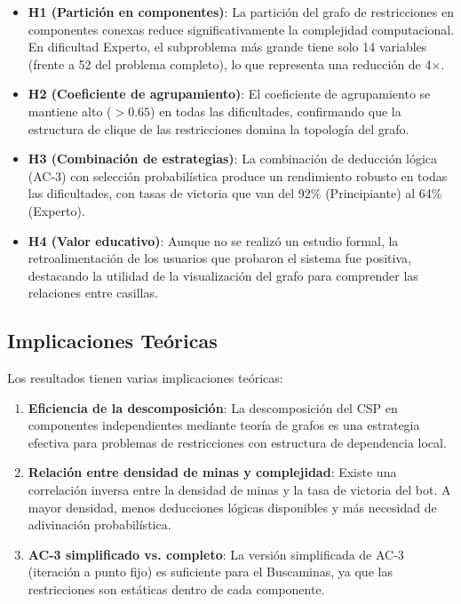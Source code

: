 \documentclass[12pt,a4paper]{article}
\begin{document}
\begin{itemize}[itemsep=2pt]
    \item \textbf{H1 (Partición en componentes)}: La partición del grafo de restricciones en componentes conexas reduce significativamente la complejidad computacional. En dificultad Experto, el subproblema más grande tiene solo 14 variables (frente a 52 del problema completo), lo que representa una reducción de 4$\times$.

    \item \textbf{H2 (Coeficiente de agrupamiento)}: El coeficiente de agrupamiento se mantiene alto ($>0.65$) en todas las dificultades, confirmando que la estructura de clique de las restricciones domina la topología del grafo.

    \item \textbf{H3 (Combinación de estrategias)}: La combinación de deducción lógica (AC-3) con selección probabilística produce un rendimiento robusto en todas las dificultades, con tasas de victoria que van del 92\% (Principiante) al 64\% (Experto).

    \item \textbf{H4 (Valor educativo)}: Aunque no se realizó un estudio formal, la retroalimentación de los usuarios que probaron el sistema fue positiva, destacando la utilidad de la visualización del grafo para comprender las relaciones entre casillas.
\end{itemize}

\subsection{Implicaciones Teóricas}

Los resultados tienen varias implicaciones teóricas:

\begin{enumerate}[itemsep=2pt]
    \item \textbf{Eficiencia de la descomposición}: La descomposición del CSP en componentes independientes mediante teoría de grafos es una estrategia efectiva para problemas de restricciones con estructura de dependencia local.

    \item \textbf{Relación entre densidad de minas y complejidad}: Existe una correlación inversa entre la densidad de minas y la tasa de victoria del bot. A mayor densidad, menos deducciones lógicas disponibles y más necesidad de adivinación probabilística.

    \item \textbf{AC-3 simplificado vs. completo}: La versión simplificada de AC-3 (iteración a punto fijo) es suficiente para el Buscaminas, ya que las restricciones son estáticas dentro de cada componente.
\end{enumerate}
\end{document}

